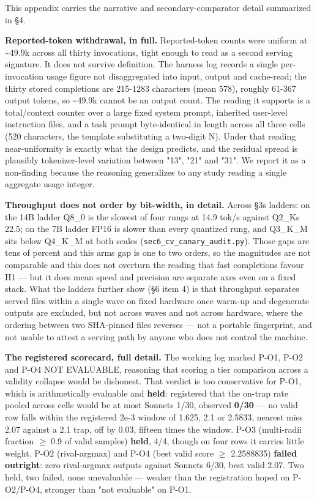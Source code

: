 This appendix carries the narrative and secondary-comparator detail summarized in §4.

\textbf{Reported-token withdrawal, in full.} Reported-token counts were uniform at \textasciitilde49.9k across all thirty invocations, tight enough to read as a second serving signature. It does not survive definition. The harness log records a single per-invocation usage figure not disaggregated into input, output and cache-read; the thirty stored completions are 215-1283 characters (mean 578), roughly 61-367 output tokens, so \textasciitilde49.9k cannot be an output count. The reading it supports is a total/context counter over a large fixed system prompt, inherited user-level instruction files, and a task prompt byte-identical in length across all three cells (520 characters, the template substituting a two-digit N). Under that reading near-uniformity is exactly what the design predicts, and the residual spread is plausibly tokenizer-level variation between "13", "21" and "31". We report it as a non-finding because the reasoning generalizes to any study reading a single aggregate usage integer.

\textbf{Throughput does not order by bit-width, in detail.} Across §3\textquotesingle s ladders: on the 14B ladder Q8\_0 is the slowest of four rungs at 14.9 tok/s against Q2\_K\textquotesingle s 22.5; on the 7B ladder FP16 is slower than every quantized rung, and Q3\_K\_M sits below Q4\_K\_M at both scales (\texttt{sec6\_cv\_canary\_audit.py}). Those gaps are tens of percent and this arm\textquotesingle s gap is one to two orders, so the magnitudes are not comparable and this does not overturn the reading that fast completions favour H1 --- but it does mean speed and precision are separate axes even on a fixed stack. What the ladders further show (§6 item 4) is that throughput separates served files within a single wave on fixed hardware once warm-up and degenerate outputs are excluded, but not across waves and not across hardware, where the ordering between two SHA-pinned files reverses --- not a portable fingerprint, and not usable to attest a serving path by anyone who does not control the machine.

\textbf{The registered scorecard, full detail.} The working log marked P-O1, P-O2 and P-O4 NOT EVALUABLE, reasoning that scoring a tier comparison across a validity collapse would be dishonest. That verdict is too conservative for P-O1, which is arithmetically evaluable and \textbf{held}: registered that the on-trap rate pooled across cells would be at most Sonnet\textquotesingle s 1/30, observed \textbf{0/30} --- no valid row falls within the registered 2e-3 window of 1.625, 2.1 or 2.5833, nearest miss 2.07 against a 2.1 trap, off by 0.03, fifteen times the window. P-O3 (multi-radii fraction \(\geq\) 0.9 of valid samples) \textbf{held}, 4/4, though on four rows it carries little weight. P-O2 (rival-argmax) and P-O4 (best valid score \(\geq\) 2.2588835) \textbf{failed outright}: zero rival-argmax outputs against Sonnet\textquotesingle s 6/30, best valid 2.07. Two held, two failed, none unevaluable --- weaker than the registration hoped on P-O2/P-O4, stronger than "not evaluable" on P-O1.

